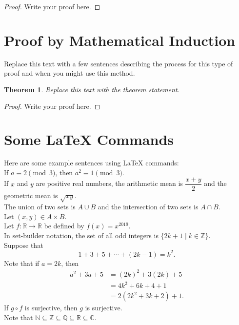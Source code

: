 \documentclass{article}
\newtheorem*{theorem}{Theorem}
\newcommand{\NN}{\mathbb{N}}
\newcommand{\ZZ}{\mathbb{Z}}
\newcommand{\RR}{\mathbb{R}}
\newcommand{\QQ}{\mathbb{Q}}
\newcommand{\CC}{\mathbb{C}}
\begin{document}
\begin{proof}
  Write your proof here.
\end{proof}

\section{Proof by Mathematical Induction}

Replace this text with a few sentences describing the process for this type of proof and when you might use this method.

\begin{theorem}
  Replace this text with the theorem statement.
\end{theorem}

\begin{proof}
  Write your proof here.
\end{proof}

\section*{Some LaTeX Commands}

Here are some example sentences using LaTeX commands:\\
If $a\equiv 2\pmod{3}$, then $a^2\equiv 1\pmod 3$.\\
If $x$ and $y$ are positive real numbers, the arithmetic mean is $\dfrac{x+y}{2}$ and the geometric mean is $\sqrt{xy}$.\\
The union of two sets is $A\cup B$ and the intersection of two sets is $A\cap B$.\\
Let $(x,y)\in A\times B$.\\
Let $f:\mathbb{R}\to\mathbb{R}$ be defined by $f(x)=x^{2019}$.\\
In set-builder notation,  the set of all odd integers is $\{2k+1\mid k\in\mathbb{Z}\}$.\\
Suppose that
\[1+3+5+\cdots+(2k-1) = k^2.\]
Note that if $a=2k$, then
\begin{align*}
    a^2+3a+5 &= (2k)^2+3(2k)+5 \\
             &= 4k^2+6k+4+1 \\
             &= 2(2k^2+3k+2)+1.
\end{align*}
If $g\circ f$ is surjective, then $g$ is surjective.\\
Note that $\NN\subseteq \ZZ\subseteq \QQ\subseteq\RR\subseteq\CC$.
\end{document}

